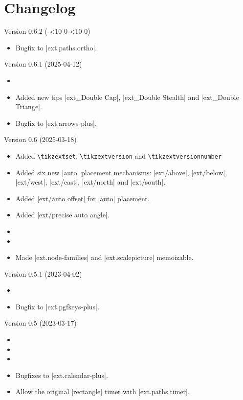 \section*{Changelog}
\begin{multicols}{2}\raggedright
\noindent
Version 0.6.2 (\the\year-\ifnum\month<10 0\fi\the\month-\ifnum\day<10 0\fi\the\day)
\begin{itemize}
\item Bugfix to |ext.paths.ortho|.
\end{itemize}
Version 0.6.1 (2025-04-12)
\begin{itemize}
\item {}
\item Added new tips |ext_Double Cap|, |ext_Double Stealth| and |ext_Double Triange|.
\item Bugfix to |ext.arrows-plus|. \cite{GH18}
\end{itemize}
Version 0.6 (2025-03-18)
\begin{itemize}
\item Added \texttt{\textbackslash tikzextset},
            \texttt{\textbackslash tikzextversion} and
            \texttt{\textbackslash tikzextversionnumber}
\item Added six new |auto| placement mechanisms:
      |ext/above|, |ext/below|, |ext/west|, |ext/east|, |ext/north| and |ext/south|.
\item Added |ext/auto offset| for |auto| placement.
\item Added |ext/precise auto angle|.
\item {}
\item {}
\item Made |ext.node-families| and |ext.scalepicture| memoizable.
\end{itemize}
Version 0.5.1 (2023-04-02)
\begin{itemize}
\item {}
\item Bugfix to |ext.pgfkeys-plus|. \cite{GH6}
\end{itemize}
Version 0.5 (2023-03-17)
\begin{itemize}
\item {}
\item {}
\item {}
\item Bugfixes to |ext.calendar-plus|.
\item Allow the original |rectangle| timer with |ext.paths.timer|.

\end{itemize}
\end{multicols}
